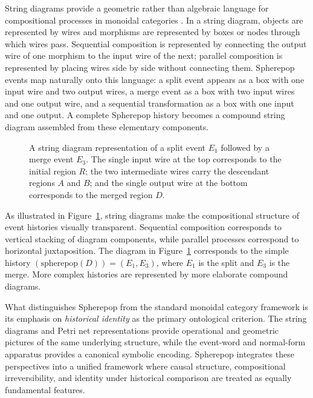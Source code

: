 \documentclass[12pt]{article}
\theoremstyle{plain}
\theoremstyle{definition}
\theoremstyle{remark}
\begin{document}
String diagrams provide a geometric rather than algebraic language for
compositional processes in monoidal categories \citep{BaezStay2010}.  In a
string diagram, objects are represented by wires and morphisms are represented
by boxes or nodes through which wires pass.  Sequential composition is
represented by connecting the output wire of one morphism to the input wire of
the next; parallel composition is represented by placing wires side by side
without connecting them.  Spherepop events map naturally onto this language:
a split event appears as a box with one input wire and two output wires, a
merge event as a box with two input wires and one output wire, and a sequential
transformation as a box with one input and one output.  A complete Spherepop
history becomes a compound string diagram assembled from these elementary
components.

\begin{figure}[ht]
\centering
{}
\caption{A string diagram representation of a split event $E_1$ followed by a
merge event $E_3$.  The single input wire at the top corresponds to the initial
region $R$; the two intermediate wires carry the descendant regions $A$ and
$B$; and the single output wire at the bottom corresponds to the merged region
$D$.}
\label{fig:string}
\end{figure}

As illustrated in Figure~\ref{fig:string}, string diagrams make the
compositional structure of event histories visually transparent.  Sequential
composition corresponds to vertical stacking of diagram components, while
parallel processes correspond to horizontal juxtaposition.  The diagram in
Figure~\ref{fig:string} corresponds to the simple history
$(\text{spherepop}(D)) = (E_1, E_3)$, where $E_1$ is the split and $E_3$ is
the merge.  More complex histories are represented by more elaborate compound
diagrams.

What distinguishes Spherepop from the standard monoidal category framework is
its emphasis on \emph{historical identity} as the primary ontological criterion.
The string diagrams and Petri net representations provide operational and
geometric pictures of the same underlying structure, while the event-word and
normal-form apparatus provides a canonical symbolic encoding.  Spherepop
integrates these perspectives into a unified framework where causal structure,
compositional irreversibility, and identity under historical comparison are
treated as equally fundamental features.
\end{document}
